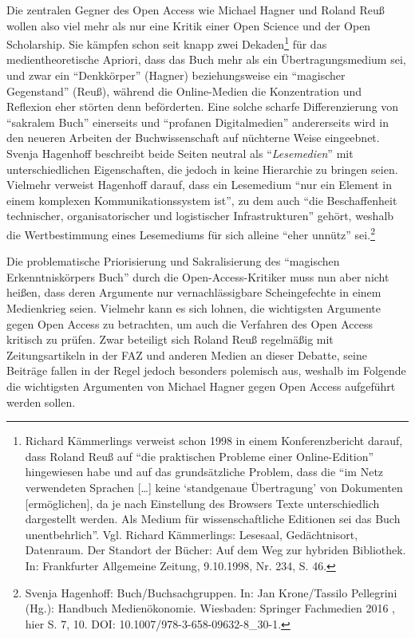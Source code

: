 \documentclass[a4paper,
fontsize=11pt,
oneside,
numbers=noperiodatend,
parskip=half-,
bibliography=totoc,
final
]{scrartcl}
\begin{document}
Die zentralen Gegner des Open Access wie Michael Hagner und Roland Reuß
wollen also viel mehr als nur eine Kritik einer Open Science und der
Open Scholarship. Sie kämpfen schon seit knapp zwei Dekaden\footnote{Richard
  Kämmerlings verweist schon 1998 in einem Konferenzbericht darauf, dass
  Roland Reuß auf \enquote{die praktischen Probleme einer
  Online-Edition} hingewiesen habe und auf das grundsätzliche Problem,
  dass die \enquote{im Netz verwendeten Sprachen {[}\ldots{}{]} keine
  \enquote{standgenaue Übertragung} von Dokumenten {[}ermöglichen{]}, da
  je nach Einstellung des Browsers Texte unterschiedlich dargestellt
  werden. Als Medium für wissenschaftliche Editionen sei das Buch
  unentbehrlich}. Vgl. Richard Kämmerlings: Lesesaal, Gedächtnisort,
  Datenraum. Der Standort der Bücher: Auf dem Weg zur hybriden
  Bibliothek. In: Frankfurter Allgemeine Zeitung, 9.10.1998, Nr. 234, S.
  46.} für das medientheoretische Apriori, dass das Buch mehr als ein
Übertragungsmedium sei, und zwar ein \enquote{Denkkörper} (Hagner)
beziehungsweise ein \enquote{magischer Gegenstand} (Reuß), während die
Online-Medien die Konzentration und Reflexion eher störten denn
beförderten. Eine solche scharfe Differenzierung von \enquote{sakralem
Buch} einerseits und \enquote{profanen Digitalmedien} andererseits wird
in den neueren Arbeiten der Buchwissenschaft auf nüchterne Weise
eingeebnet. Svenja Hagenhoff beschreibt beide Seiten neutral als
\enquote{\emph{Lesemedien}} mit unterschiedlichen Eigenschaften, die
jedoch in keine Hierarchie zu bringen seien. Vielmehr verweist Hagenhoff
darauf, dass ein Lesemedium \enquote{nur ein Element in einem komplexen
Kommunikationssystem ist}, zu dem auch \enquote{die Beschaffenheit
technischer, organisatorischer und logistischer Infrastrukturen} gehört,
weshalb die Wertbestimmung eines Lesemediums für sich alleine
\enquote{eher unnütz} sei.\footnote{Svenja Hagenhoff:
  Buch/Buchsachgruppen. In: Jan Krone/Tassilo Pellegrini (Hg.): Handbuch
  Medienökonomie. Wiesbaden: Springer Fachmedien 2016 , hier S. 7, 10.
  DOI: 10.1007/978-3-658-09632-8\_30-1.}

Die problematische Priorisierung und Sakralisierung des
\enquote{magischen Erkenntniskörpers Buch} durch die
Open-Access-Kritiker muss nun aber nicht heißen, dass deren Argumente
nur vernachlässigbare Scheingefechte in einem Medienkrieg seien.
Vielmehr kann es sich lohnen, die wichtigsten Argumente gegen Open
Access zu betrachten, um auch die Verfahren des Open Access kritisch zu
prüfen. Zwar beteiligt sich Roland Reuß regelmäßig mit Zeitungsartikeln
in der FAZ und anderen Medien an dieser Debatte, seine Beiträge fallen
in der Regel jedoch besonders polemisch aus, weshalb im Folgende die
wichtigsten Argumenten von Michael Hagner gegen Open Access aufgeführt
werden sollen.
\end{document}
